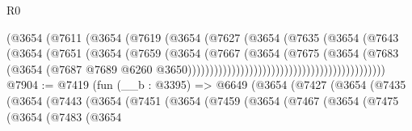 \begin{lexlean}{R0}
\begin{coremodule}
                                                  (@3654
                                                    (@7611
                                                      (@3654
                                                        (@7619
                                                          (@3654
                                                            (@7627
                                                              (@3654
                                                                (@7635
                                                                  (@3654
                                                                    (@7643
                                                                      (@3654
                                                                        (@7651
                                                                          (@3654
                                                                            (@7659
                                                                              (@3654
                                                                                (@7667
                                                                                  (@3654
                                                                                    (@7675
                                                                                      (@3654
                                                                                        (@7683
                                                                                          (@3654
                                                                                            (@7687
                                                                                              @7689
                                                                                              @6260
                                                                                              @3650)))))))))))))))))))))))))))))))))))))))))))))
@7904 := @7419
    (fun (__b : @3395) =>
    @6649
      (@3654
        (@7427
          (@3654
            (@7435
              (@3654
                (@7443
                  (@3654
                    (@7451
                      (@3654
                        (@7459
                          (@3654
                            (@7467
                              (@3654
                                (@7475
                                  (@3654
                                    (@7483
                                      (@3654

\end{coremodule}
\end{lexlean}
